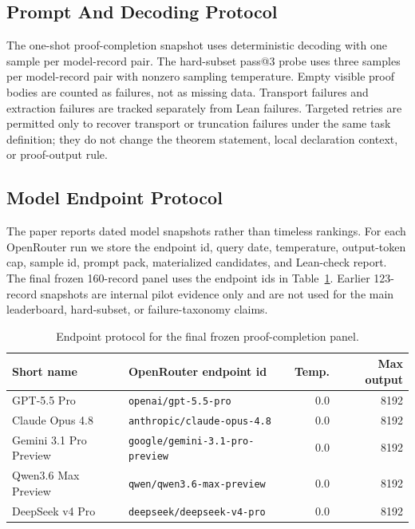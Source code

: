 \subsection{Prompt And Decoding Protocol}

The one-shot proof-completion snapshot uses deterministic decoding with one
sample per model-record pair. The hard-subset pass@3 probe uses three samples
per model-record pair with nonzero sampling temperature. Empty visible proof
bodies are counted as failures, not as missing data. Transport failures and
extraction failures are tracked separately from Lean failures. Targeted retries
are permitted only to recover transport or truncation failures under the same
task definition; they do not change the theorem statement, local declaration
context, or proof-output rule.

\subsection{Model Endpoint Protocol}

The paper reports dated model snapshots rather than timeless rankings. For each
OpenRouter run we store the endpoint id, query date, temperature, output-token
cap, sample id, prompt pack, materialized candidates, and Lean-check report.
The final frozen 160-record panel uses the endpoint ids in
Table~\ref{tab:supp-model-endpoints}. Earlier 123-record snapshots are internal
pilot evidence only and are not used for the main leaderboard, hard-subset, or
failure-taxonomy claims.

\begin{table}[H]
\centering
\caption{Endpoint protocol for the final frozen proof-completion panel.}
\label{tab:supp-model-endpoints}
\small
\begin{tabularx}{\linewidth}{lXrr}
\toprule
Short name & OpenRouter endpoint id & Temp. & Max output\\
\midrule
GPT-5.5 Pro & \texttt{openai/gpt-5.5-pro} & 0.0 & 8192\\
Claude Opus 4.8 & \texttt{anthropic/claude-opus-4.8} & 0.0 & 8192\\
Gemini 3.1 Pro Preview & \texttt{google/gemini-3.1-pro-preview} & 0.0 & 8192\\
Qwen3.6 Max Preview & \texttt{qwen/qwen3.6-max-preview} & 0.0 & 8192\\
DeepSeek v4 Pro & \texttt{deepseek/deepseek-v4-pro} & 0.0 & 8192\\
\bottomrule
\end{tabularx}
\end{table}

